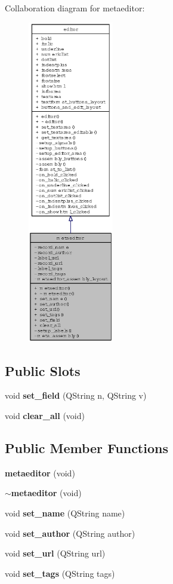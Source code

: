 Collaboration diagram for metaeditor:\begin{figure}[H]
\begin{center}
\leavevmode
\includegraphics[width=106pt]{classmetaeditor__coll__graph}
\end{center}
\end{figure}
\subsection*{Public Slots}
\begin{CompactItemize}
\item 
void {\bf set\_\-field} (QString n, QString v)
\item 
void {\bf clear\_\-all} (void)
\end{CompactItemize}
\subsection*{Public Member Functions}
\begin{CompactItemize}
\item 
{\bf metaeditor} (void)
\item 
{\bf $\sim$metaeditor} (void)
\item 
void {\bf set\_\-name} (QString name)
\item 
void {\bf set\_\-author} (QString author)
\item 
void {\bf set\_\-url} (QString url)
\item 
void {\bf set\_\-tags} (QString tags)
\end{CompactItemize}
